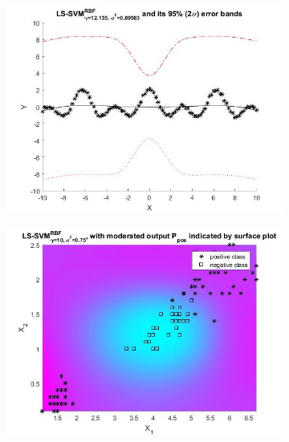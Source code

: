 \documentclass[11pt,oneside,a4paper]{article}
\begin{document}
\begin{figure}[H]
	\begin{subfigure}[b]{0.4\textwidth}
		\includegraphics[width=\textwidth]{../Figures/test_data_bayes}
	\end{subfigure}
	\begin{subfigure}[b]{0.4\textwidth}
		\includegraphics[width=\textwidth]{../Figures/dig_sig}
	\end{subfigure}
	\begin{subfigure}[b]{0.4\textwidth}

\end{subfigure}
\end{figure}
\end{document}
